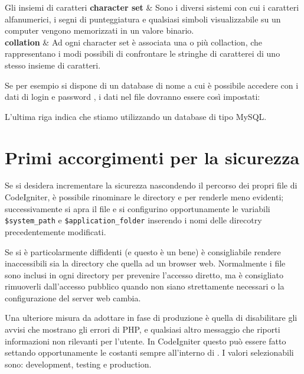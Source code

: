 \begin{deftabg}{Gli insiemi di caratteri}
\textbf{character set} & Sono i diversi sistemi con cui i caratteri alfanumerici, i segni di punteggiatura e qualsiasi simboli visualizzabile su un computer vengono memorizzati in un valore binario. \\
\midrule
\textbf{collation} & Ad ogni character set è associata una o più collaction, che rappresentano i modi possibili di confrontare le stringhe di caratterei di uno stesso insieme di caratteri. \\
\end{deftabg}

Se per esempio si dispone di un database di nome  a cui è possibile accedere con i dati di login  e password , i dati nel file  dovranno essere così impostati:


L'ultima riga indica che stiamo utilizzando un database di tipo MySQL. 

\section{Primi accorgimenti per la sicurezza}
Se si desidera incrementare la sicurezza nascondendo il percorso dei propri file di CodeIgniter, è possibile rinominare le directory  e  per renderle meno evidenti; successivamente si apra il file  e si configurino opportunamente le variabili \verb|$system_path| e \verb|$application_folder| inserendo i nomi delle direcotry precedentemente modificati.

Se si è particolarmente diffidenti (e questo è un bene) è consigliabile rendere inaccessibili sia la directory  che quella  ad un browser web. Normalmente i file  sono inclusi in ogni directory per prevenire l'accesso diretto, ma è consigliato rimuoverli dall'accesso pubblico quando non siano strettamente necessari o la configurazione del server web cambia. 

Una ulteriore misura da adottare in fase di produzione è quella di disabilitare gli avvisi che mostrano gli errori di \ac{PHP}, e qualsiasi altro messaggio che riporti informazioni non rilevanti per l'utente. In CodeIgniter questo può essere fatto settando opportunamente le costanti  sempre all'interno di . I valori selezionabili sono: development, testing e production.

